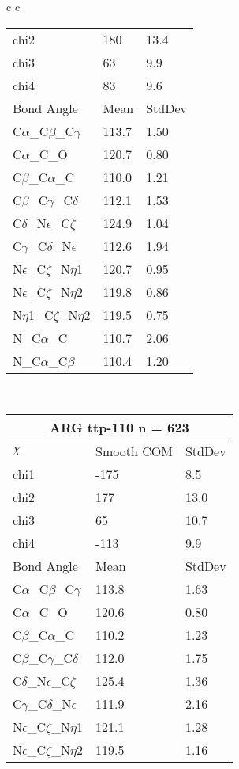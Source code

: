 \begin{longtable}{ c c }
\begin{tabular}{ l l l }
  chi2 & 180 & 13.4 \\ 
  chi3 & 63 & 9.9 \\ 
  chi4 & 83 & 9.6 \\ \midrule
  Bond Angle   & Mean     & StdDev \\ \midrule
  C$\alpha$\_C$\beta$\_C$\gamma$ & 113.7 & 1.50\\
  C$\alpha$\_C\_O & 120.7 & 0.80\\
  C$\beta$\_C$\alpha$\_C & 110.0 & 1.21\\
  C$\beta$\_C$\gamma$\_C$\delta$ & 112.1 & 1.53\\
  C$\delta$\_N$\epsilon$\_C$\zeta$ & 124.9 & 1.04\\
  C$\gamma$\_C$\delta$\_N$\epsilon$ & 112.6 & 1.94\\
  N$\epsilon$\_C$\zeta$\_N$\eta$1 & 120.7 & 0.95\\
  N$\epsilon$\_C$\zeta$\_N$\eta$2 & 119.8 & 0.86\\
  N$\eta$1\_C$\zeta$\_N$\eta$2 & 119.5 & 0.75\\
  N\_C$\alpha$\_C & 110.7 & 2.06\\
  N\_C$\alpha$\_C$\beta$ & 110.4 & 1.20\\
  \bottomrule
  \end{tabular}
  \\
  \begin{tabular}{ l l l }
  \toprule
  \multicolumn{3}{c}{ARG \textbf{ttp-110} n = 623} \\ \toprule
  $\chi$       & Smooth COM & StdDev \\ \midrule
  chi1 & -175 & 8.5 \\ 
  chi2 & 177 & 13.0 \\ 
  chi3 & 65 & 10.7 \\ 
  chi4 & -113 & 9.9 \\ \midrule
  Bond Angle   & Mean     & StdDev \\ \midrule
  C$\alpha$\_C$\beta$\_C$\gamma$ & 113.8 & 1.63\\
  C$\alpha$\_C\_O & 120.6 & 0.80\\
  C$\beta$\_C$\alpha$\_C & 110.2 & 1.23\\
  C$\beta$\_C$\gamma$\_C$\delta$ & 112.0 & 1.75\\
  C$\delta$\_N$\epsilon$\_C$\zeta$ & 125.4 & 1.36\\
  C$\gamma$\_C$\delta$\_N$\epsilon$ & 111.9 & 2.16\\
  N$\epsilon$\_C$\zeta$\_N$\eta$1 & 121.1 & 1.28\\
  N$\epsilon$\_C$\zeta$\_N$\eta$2 & 119.5 & 1.16\\

\end{tabular}
\end{longtable}

